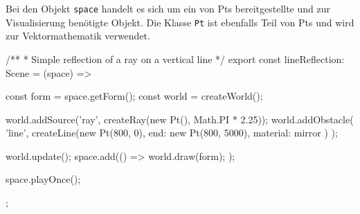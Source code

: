 Bei den Objekt \texttt{space} handelt es sich um ein von Pts bereitgestellte und zur Visualisierung benötigte Objekt. 
Die Klasse \texttt{Pt} ist ebenfalls Teil von Pts und wird zur Vektormathematik verwendet.
\newpage

\begin{verbnobox}[\scriptsize\mbox{}]
/**
 * Simple reflection of a ray on a vertical line
 */
export const lineReflection: Scene = (space) => {
    const form = space.getForm();
    const world = createWorld();

    world.addSource('ray', createRay(new Pt(), Math.PI * 2.25));
    world.addObstacle(
        'line',
        createLine(new Pt(800, 0), { end: new Pt(800, 5000), material: mirror })
    );

    world.update();
    space.add(() => {
        world.draw(form);
    });

    space.playOnce();
};
\end{verbnobox}